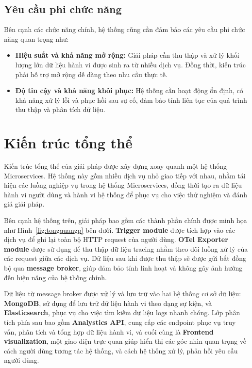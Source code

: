 \documentclass{uetgraduation}
\begin{document}
\subsection{Yêu cầu phi chức năng}
Bên cạnh các chức năng chính, hệ thống cũng cần đảm bảo các yêu cầu phi chức năng quan trọng như:
\begin{itemize}
    \item \textbf{Hiệu suất và khả năng mở rộng:} Giải pháp cần thu thập và xử lý khối lượng lớn dữ liệu hành vi được sinh ra từ nhiều dịch vụ. Đồng thời, kiến trúc phải hỗ trợ mở rộng dễ dàng theo nhu cầu thực tế.
    \item \textbf{Độ tin cậy và khả năng khôi phục:} Hệ thống cần hoạt động ổn định, có khả năng xử lý lỗi và phục hồi sau sự cố, đảm bảo tính liên tục của quá trình thu thập và phân tích dữ liệu.
\end{itemize}
 \newpage
	\section{Kiến trúc tổng thể}

Kiến trúc tổng thể của giải pháp được xây dựng xoay quanh một hệ thống Microservices. Hệ thống này gồm nhiều dịch vụ nhỏ giao tiếp với nhau, nhằm tái hiện các luồng nghiệp vụ trong hệ thống Microservices, đồng thời tạo ra dữ liệu hành vi người dùng và hành vi hệ thống để phục vụ cho việc thử nghiệm và đánh giá giải pháp.

Bên cạnh hệ thống trên, giải pháp bao gồm các thành phần chính được minh họa như Hình~\ref{fig:tongquangp} bên dưới. \textbf{Trigger module} được tích hợp vào các dịch vụ để ghi lại toàn bộ HTTP request của người dùng. \textbf{OTel Exporter module} được sử dụng để thu thập dữ liệu tracing nhằm theo dõi luồng xử lý của các request giữa các dịch vụ. Dữ liệu sau khi được thu thập sẽ được gửi bất đồng bộ qua \textbf{message broker}, giúp đảm bảo tính linh hoạt và không gây ảnh hưởng đến hiệu năng của hệ thống chính.

Dữ liệu từ message broker được xử lý và lưu trữ vào hai hệ thống cơ sở dữ liệu: \textbf{MongoDB}, sử dụng để lưu trữ dữ liệu hành vi theo dạng sự kiện, và \textbf{Elasticsearch}, phục vụ cho việc tìm kiếm dữ liệu logs nhanh chóng. Lớp phân tích phía sau bao gồm \textbf{Analystics API}, cung cấp các endpoint phục vụ truy vấn, phân tích và tổng hợp dữ liệu hành vi, và cuối cùng là \textbf{Frontend visualization}, một giao diện trực quan giúp hiển thị các góc nhìn quan trọng về cách người dùng tương tác hệ thống, và cách hệ thống xử lý, phản hồi yêu cầu người dùng.
\end{document}
